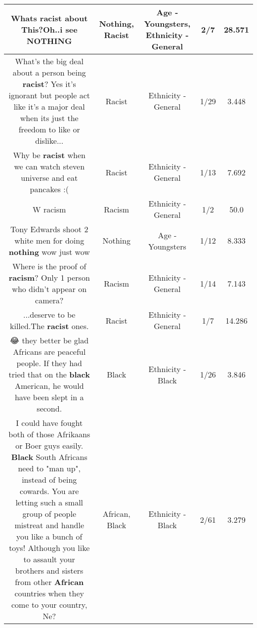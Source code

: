 \documentclass[11pt]{article}
\newlength\mylength
\begin{document}
\begin{center}
\begin{longtable}{|C{.65\mylength}|C{.30\mylength}|C{.12\mylength}|C{.12\mylength}|C{.12\mylength}|}
  \small Whats \textbf{racist} about This?Oh..i see NOTHING\normalsize   & Nothing, Racist & Age - Youngsters, Ethnicity - General & 2/7 & 28.571 \\  \hline
  \small What's the big deal about a person being \textbf{racist}? Yes it's ignorant but people act like it's a major deal when its just the freedom to like or dislike...\normalsize   & Racist & Ethnicity - General & 1/29 & 3.448 \\  \hline
  \small Why be \textbf{racist} when we can watch steven universe and eat pancakes :(\normalsize   & Racist & Ethnicity - General & 1/13 & 7.692 \\  \hline
  \small W racism\normalsize   & Racism & Ethnicity - General & 1/2 & 50.0 \\  \hline
  \small Tony Edwards shoot 2 white men for doing \textbf{nothing} wow just wow\normalsize   & Nothing & Age - Youngsters & 1/12 & 8.333 \\  \hline
  \small Where is the proof of \textbf{racism}?  Only 1 person who didn't appear on camera?\normalsize   & Racism & Ethnicity - General & 1/14 & 7.143 \\  \hline
  \small ...deserve to be killed.The \textbf{racist} ones.\normalsize   & Racist & Ethnicity - General & 1/7 & 14.286 \\  \hline
  \small 😂 they better be glad Africans are peaceful people. If they had tried that on the \textbf{black} American, he would have been slept in a second.\normalsize   & Black & Ethnicity - Black & 1/26 & 3.846 \\  \hline
  \small I could have fought both of those Afrikaans or Boer guys easily. \textbf{Black} South Africans need to "man up", instead of being cowards. You are letting such a small group of people mistreat and handle you like a bunch of toys! Although you like to assault your brothers and sisters from other \textbf{African} countries when they come to your country, Ne?\normalsize   & African, Black & Ethnicity - Black & 2/61 & 3.279 \\  \hline

\end{longtable}
\end{center}
\end{document}
